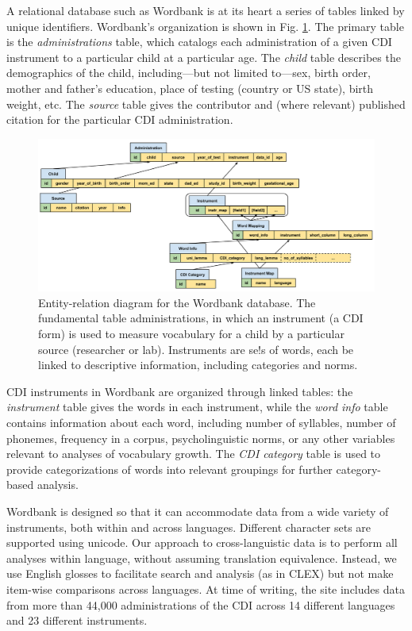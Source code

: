 \documentclass[doc,noapacite]{apa2}
\newcommand{\comment}[1]{\marginpar[]{\small \textcolor{blue}{#1}}}
\begin{document}
A relational database such as Wordbank is at its heart a series of tables linked by unique identifiers. Wordbank's organization is shown in Fig. \ref{fig:entities}. \comment{This whole section needs checking/rewriting, it's out of date.} The primary table is the \emph{administrations} table, which catalogs each administration of a given CDI instrument to a particular child at a particular age. The \emph{child} table describes the demographics of the child, including---but not limited to---sex, birth order, mother and father's education, place of testing (country or US state), birth weight, etc. The \emph{source} table gives the contributor and (where relevant) published citation for the particular CDI administration.

\begin{figure}[t]
\centering
\includegraphics[width=6in]{figures/entities.pdf}
\caption{\label{fig:entities} Entity-relation diagram for the Wordbank database. The fundamental table administrations, in which an instrument (a CDI form) is used to measure vocabulary for a child by a particular source (researcher or lab). Instruments are se!s of words, each be linked to descriptive information, including categories and norms.}
\end{figure}

CDI instruments in Wordbank are organized through linked tables: the \emph{instrument} table gives the words in each instrument, while the \emph{word info} table contains information about each word, including number of syllables, number of phonemes, frequency in a corpus, psycholinguistic norms, or any other variables relevant to analyses of vocabulary growth. The \emph{CDI category} table is used to provide categorizations of words into relevant groupings for further category-based analysis.

Wordbank is designed so that it can accommodate data from a wide variety of instruments, both within and across languages. Different character sets are supported using unicode. Our approach to cross-languistic data is to perform all analyses within language, without assuming translation equivalence. Instead, we use English glosses to facilitate search and analysis (as in CLEX) but not make item-wise comparisons across languages. At time of writing, the site includes data from more than 44,000 administrations of the CDI across 14 different languages and 23 different instruments. \comment{Update before submission.}
\end{document}
